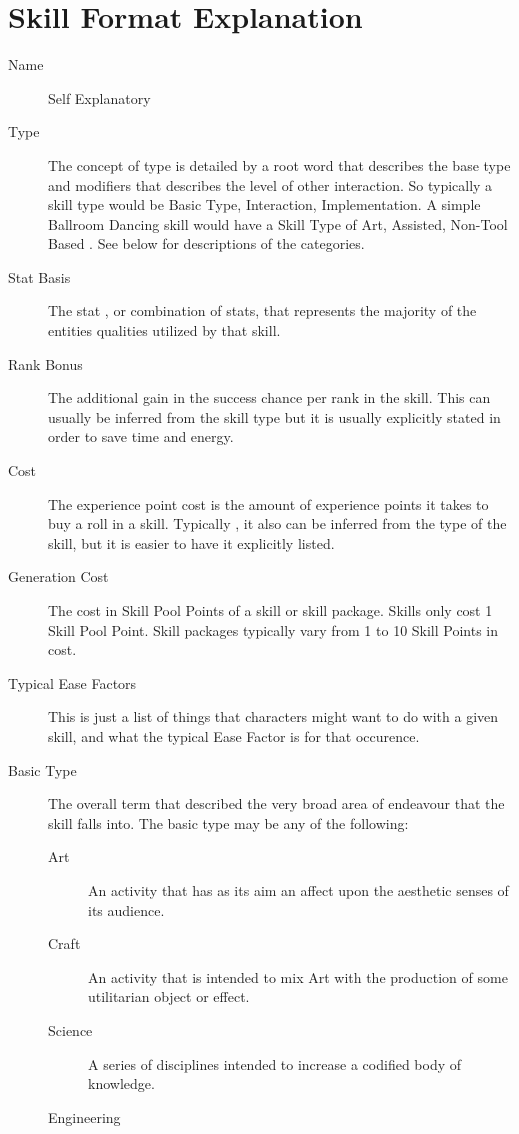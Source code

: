 \section{Skill Format Explanation}
\begin{description}
	\item[Name]
	Self Explanatory
	\item[Type]
	The concept of type is detailed by a root word that describes the base
	type and modifiers that describes the level of other interaction. So
	typically a skill type would be Basic Type, Interaction, Implementation.
	A simple Ballroom Dancing skill would have a Skill Type of
	Art, Assisted, Non-Tool Based . See below for descriptions of the
	categories.
	\item[Stat Basis]
	The stat , or combination of stats, that represents the majority of the
	entities qualities utilized by that skill.
	\item[Rank Bonus]
	The additional gain in the success chance per rank in the skill. This can
	usually be inferred from the skill type but it is usually explicitly
	stated in order to save time and energy.
	\item[Cost]
	The experience point cost is the amount of experience points it takes to
	buy a roll in a skill. Typically , it also can be inferred from the type
	of the skill, but it is easier to have it explicitly listed.
	\item[Generation Cost]
	The cost in Skill Pool Points of a skill or skill package. Skills
	only cost 1 Skill Pool Point. Skill packages typically vary from 1
	to 10 Skill Points in cost.
	\item[Typical Ease Factors]
	This is just a list of things that characters might want to do with a
	given skill, and what the typical Ease Factor is for that occurence.
	\item[Basic Type]
	The overall term that described the very broad area of
	endeavour that the skill falls into. The basic type may be any of the 
	following:
	\begin{description}
		\item[Art ]
		An activity that has as its aim an affect upon the aesthetic senses of its
		audience.
		\item[Craft]
		An activity that is intended to mix Art with the production of some
		utilitarian object or effect.
		\item[Science]
		A series of disciplines intended to increase a codified body of
		knowledge.
		\item[Engineering]

\end{description}
\end{description}
